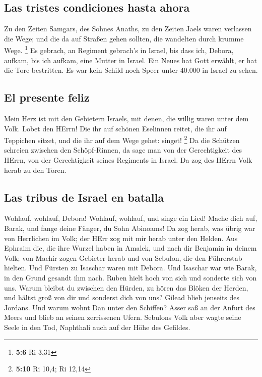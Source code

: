 \hypertarget{las-tristes-condiciones-hasta-ahora}{%
\subsection{Las tristes condiciones hasta
ahora}\label{las-tristes-condiciones-hasta-ahora}}

 Zu den Zeiten Samgars, des Sohnes Anaths, zu den Zeiten
Jaels waren verlassen die Wege; und die da auf Straßen gehen sollten,
die wandelten durch krumme Wege. \footnote{\textbf{5:6} Ri 3,31}
 Es gebrach, an Regiment gebrach's in Israel, bis dass
ich, Debora, aufkam, bis ich aufkam, eine Mutter in Israel.
 Ein Neues hat Gott erwählt, er hat die Tore bestritten.
Es war kein Schild noch Speer unter 40.000 in Israel zu sehen.

\hypertarget{el-presente-feliz}{%
\subsection{El presente feliz}\label{el-presente-feliz}}

 Mein Herz ist mit den Gebietern Israels, mit denen, die
willig waren unter dem Volk. Lobet den HErrn!  Die ihr
auf schönen Eselinnen reitet, die ihr auf Teppichen sitzet, und die ihr
auf dem Wege gehet: singet! \footnote{\textbf{5:10} Ri 10,4; Ri 12,14}
 Da die Schützen schreien zwischen den Schöpf-Rinnen, da
sage man von der Gerechtigkeit des HErrn, von der Gerechtigkeit seines
Regiments in Israel. Da zog des HErrn Volk herab zu den Toren.

\hypertarget{las-tribus-de-israel-en-batalla}{%
\subsection{Las tribus de Israel en
batalla}\label{las-tribus-de-israel-en-batalla}}

 Wohlauf, wohlauf, Debora! Wohlauf, wohlauf, und singe
ein Lied! Mache dich auf, Barak, und fange deine Fänger, du Sohn
Abinoams!  Da zog herab, was übrig war von Herrlichen im
Volk; der HErr zog mit mir herab unter den Helden.  Aus
Ephraim die, die ihre Wurzel haben in Amalek, und nach dir Benjamin in
deinem Volk; von Machir zogen Gebieter herab und von Sebulon, die den
Führerstab hielten.  Und Fürsten zu Isaschar waren mit
Debora. Und Isaschar war wie Barak, in den Grund gesandt ihm nach. Ruben
hielt hoch von sich und sonderte sich von uns.  Warum
bleibst du zwischen den Hürden, zu hören das Blöken der Herden, und
hältst groß von dir und sonderst dich von uns?  Gilead
blieb jenseits des Jordans. Und warum wohnt Dan unter den Schiffen?
Asser saß an der Anfurt des Meers und blieb an seinen zerrissenen Ufern.
 Sebulons Volk aber wagte seine Seele in den Tod,
Naphthali auch auf der Höhe des Gefildes.

